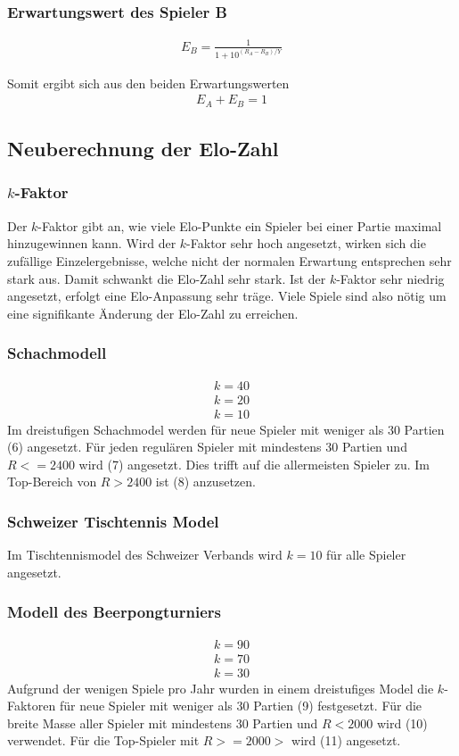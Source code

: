 \documentclass[a4paper, 12pt]{article}
\newcounter{arti}
\begin{document}
\subsubsection{Erwartungswert des Spieler B}
\begin{align}
E_{B} = \frac{1}{1+10^{(R_{A}-R_{B})/Y}}
\end{align}

Somit ergibt sich aus den beiden Erwartungswerten
\begin{align}
E_A + E_B = 1
\end{align}

\subsection{Neuberechnung der Elo-Zahl}
\subsubsection{\(k\)-Faktor}
Der \(k\)-Faktor gibt an, wie viele Elo-Punkte ein Spieler bei einer Partie maximal hinzugewinnen kann.
Wird der \(k\)-Faktor sehr hoch angesetzt, wirken sich die zufällige Einzelergebnisse, welche nicht der normalen Erwartung entsprechen sehr stark aus. Damit schwankt die Elo-Zahl sehr stark.
Ist der \(k\)-Faktor sehr niedrig angesetzt, erfolgt eine Elo-Anpassung sehr träge. Viele Spiele sind also nötig um eine signifikante Änderung der Elo-Zahl zu erreichen.
\subsubsection{Schachmodell}
\begin{align}
k=40
\\k=20
\\k=10
\end{align}
Im dreistufigen Schachmodel werden für neue Spieler mit weniger als 30 Partien (6) angesetzt.
Für jeden regulären Spieler mit mindestens 30 Partien und \(R <= 2400\) wird (7) angesetzt. Dies trifft auf die allermeisten Spieler zu.
Im Top-Bereich von \(R > 2400 \) ist (8) anzusetzen.
\subsubsection{Schweizer Tischtennis Model}
Im Tischtennismodel des Schweizer Verbands wird \(k=10\) für alle Spieler angesetzt.
\subsubsection{Modell des Beerpongturniers}
\begin{align}
k=90
\\k=70
\\k=30
\end{align}
Aufgrund der wenigen Spiele pro Jahr wurden in einem dreistufiges Model die \(k\)-Faktoren für neue Spieler mit weniger als 30 Partien (9) festgesetzt. Für die breite Masse aller Spieler mit mindestens 30 Partien und \(R< 2000\) wird (10) verwendet. Für die Top-Spieler mit \(R>=2000>\) wird (11) angesetzt.
\end{document}
